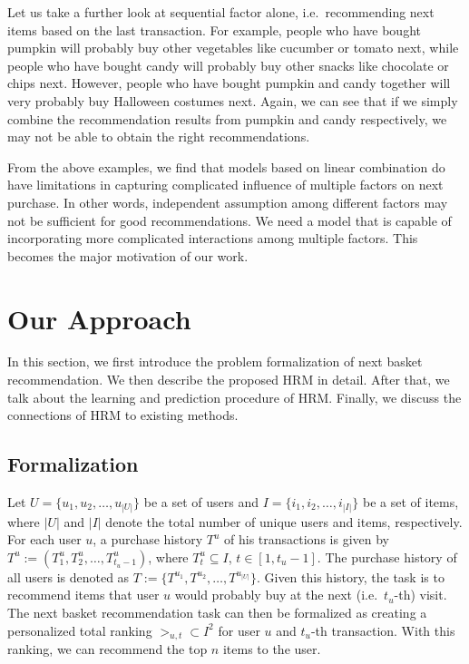 \documentclass[10pt,journal,compsoc]{IEEEtran}
\begin{document}
Let us take a further look at sequential factor alone, i.e.~recommending next items based on the last transaction. For example, people who have bought pumpkin will probably buy other vegetables like cucumber or tomato next, while people who have bought candy will probably buy other snacks like chocolate or chips next. However, people who have bought pumpkin and candy together will very probably buy Halloween costumes next. Again, we can see that if we simply combine the recommendation results from pumpkin and candy respectively, we may not be able to obtain the right recommendations.

From the above examples, we find that models based on linear combination do have limitations in capturing complicated influence of multiple factors on next purchase. In other words, independent assumption among different factors may not be sufficient for good recommendations. We need a model that is capable of incorporating more complicated interactions among multiple factors. This becomes the major motivation of our work.

\section{Our Approach}
In this section, we first introduce the problem formalization of next basket recommendation. We then describe the proposed HRM in detail. After that, we talk about the learning and prediction procedure of HRM. Finally, we discuss the connections of HRM to existing methods.

\subsection{Formalization}
Let $U=\{u_1,u_2,\ldots,u_{|U|}\}$ be a set of users and $I=\{i_1,i_2,\ldots,i_{|I|}\}$ be a set of items, where $|U|$ and $|I|$ denote the total number of unique users and items, respectively. For each user $u$, a purchase history $T^u$ of his transactions is given by $T^u:=(T^u_1,T^u_2,\ldots,T^u_{t_u-1} )$, where $T^u_t \subseteq I$, $t\in [1,t_u-1]$. The purchase history of all users is denoted as $T:=\{T^{u_1},T^{u_2},\ldots,T^{u_{|U|}} \}$.
Given this history, the task is to recommend items that user $u$ would probably buy at the next (i.e.~$t_u$-th) visit.
The next basket recommendation task can then be formalized as creating a personalized total ranking $>_{u,t}\subset I^2$ for user $u$ and $t_u$-th transaction. With this ranking, we can recommend the top $n$ items to the user.
\end{document}
